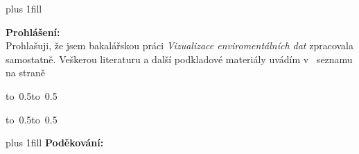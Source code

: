 \documentclass[12pt,a4paper]{report}
\begin{document}
\vglue 0pt plus 1fill

\noindent
{\bfseries Prohlášení:} \\
Prohlašuji, že jsem bakalářskou práci \emph{Vizualizace enviromentálních dat} zpracovala samostatně. Veškerou literaturu a další podkladové materiály uvádím v~ seznamu na straně %

\vspace{10mm}

\hbox{\hbox to 0.5\hbox to 0.5}

\vspace{1mm}
\hbox{\hbox to 0.5\hsize{%

\hss}\hbox to 0.5}

\vspace{20mm}

\newpage

\vglue 0pt plus 1fill
\noindent
{\bfseries Poděkování:} \\

\newpage

\newpage
\end{document}
